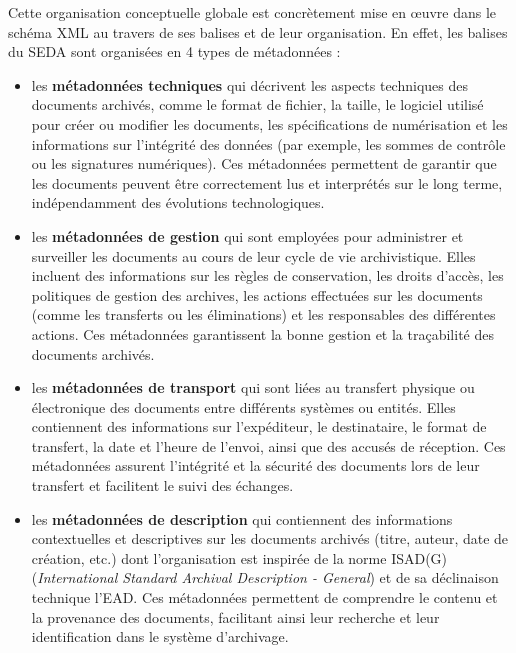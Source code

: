 Cette organisation conceptuelle globale est concrètement mise en œuvre dans le schéma \gls{XML} au travers de ses balises et de leur organisation. En effet, les balises du \gls{SEDA} sont organisées en 4 types de métadonnées : 
\begin{itemize}
	\item les \textbf{métadonnées techniques} qui décrivent les aspects techniques des documents archivés, comme le format de fichier, la taille, le logiciel utilisé pour créer ou modifier les documents, les spécifications de numérisation et les informations sur l'intégrité des données (par exemple, les sommes de contrôle ou les signatures numériques). Ces métadonnées permettent de garantir que les documents peuvent être correctement lus et interprétés sur le long terme, indépendamment des évolutions technologiques.
	\item les \textbf{métadonnées de gestion} qui sont employées pour administrer et surveiller les documents au cours de leur cycle de vie archivistique. Elles incluent des informations sur les règles de conservation, les droits d'accès, les politiques de gestion des archives, les actions effectuées sur les documents (comme les transferts ou les éliminations) et les responsables des différentes actions. Ces métadonnées garantissent la bonne gestion et la traçabilité des documents archivés.
	\item les \textbf{métadonnées de transport} qui sont liées au transfert physique ou électronique des documents entre différents systèmes ou entités. Elles contiennent des informations sur l'expéditeur, le destinataire, le format de transfert, la date et l'heure de l'envoi, ainsi que des accusés de réception. Ces métadonnées assurent l'intégrité et la sécurité des documents lors de leur transfert et facilitent le suivi des échanges.
	\item les \textbf{métadonnées de description} qui contiennent des informations contextuelles et descriptives sur les documents archivés (titre, auteur, date de création, etc.) dont l’organisation est inspirée de la norme \gls{ISAD(G)} (\textit{International Standard Archival Description - General}) et de sa déclinaison technique l’\gls{EAD}. Ces métadonnées permettent de comprendre le contenu et la provenance des documents, facilitant ainsi leur recherche et leur identification dans le système d'archivage.
\end{itemize}


